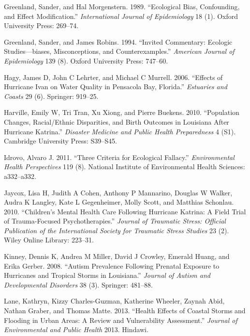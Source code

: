 \documentclass[]{article}
\begin{document}
\hypertarget{ref-greenland1989ecological}{}
Greenland, Sander, and Hal Morgenstern. 1989. ``Ecological Bias,
Confounding, and Effect Modification.'' \emph{International Journal of
Epidemiology} 18 (1). Oxford University Press: 269--74.

\hypertarget{ref-greenland1994invited}{}
Greenland, Sander, and James Robins. 1994. ``Invited Commentary:
Ecologic Studies---biases, Misconceptions, and Counterexamples.''
\emph{American Journal of Epidemiology} 139 (8). Oxford University
Press: 747--60.

\hypertarget{ref-hagy2006effects}{}
Hagy, James D, John C Lehrter, and Michael C Murrell. 2006. ``Effects of
Hurricane Ivan on Water Quality in Pensacola Bay, Florida.''
\emph{Estuaries and Coasts} 29 (6). Springer: 919--25.

\hypertarget{ref-harville2010population}{}
Harville, Emily W, Tri Tran, Xu Xiong, and Pierre Buekens. 2010.
``Population Changes, Racial/Ethnic Disparities, and Birth Outcomes in
Louisiana After Hurricane Katrina.'' \emph{Disaster Medicine and Public
Health Preparedness} 4 (S1). Cambridge University Press: S39--S45.

\hypertarget{ref-idrovo2011three}{}
Idrovo, Alvaro J. 2011. ``Three Criteria for Ecological Fallacy.''
\emph{Environmental Health Perspectives} 119 (8). National Institute of
Environmental Health Sciences: a332--a332.

\hypertarget{ref-jaycox2010children}{}
Jaycox, Lisa H, Judith A Cohen, Anthony P Mannarino, Douglas W Walker,
Audra K Langley, Kate L Gegenheimer, Molly Scott, and Matthias Schonlau.
2010. ``Children's Mental Health Care Following Hurricane Katrina: A
Field Trial of Trauma-Focused Psychotherapies.'' \emph{Journal of
Traumatic Stress: Official Publication of the International Society for
Traumatic Stress Studies} 23 (2). Wiley Online Library: 223--31.

\hypertarget{ref-kinney2008autism}{}
Kinney, Dennis K, Andrea M Miller, David J Crowley, Emerald Huang, and
Erika Gerber. 2008. ``Autism Prevalence Following Prenatal Exposure to
Hurricanes and Tropical Storms in Louisiana.'' \emph{Journal of Autism
and Developmental Disorders} 38 (3). Springer: 481--88.

\hypertarget{ref-lane2013health}{}
Lane, Kathryn, Kizzy Charles-Guzman, Katherine Wheeler, Zaynah Abid,
Nathan Graber, and Thomas Matte. 2013. ``Health Effects of Coastal
Storms and Flooding in Urban Areas: A Review and Vulnerability
Assessment.'' \emph{Journal of Environmental and Public Health} 2013.
Hindawi.
\end{document}
